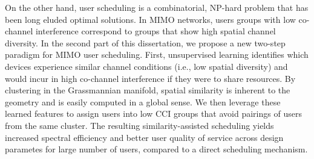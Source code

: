 On the other hand, user scheduling is a combinatorial, NP-hard problem that has been long eluded optimal solutions. 
In MIMO networks, users groups with low co-channel interference correspond to groups that show high spatial channel diversity. 
In the second part of this dissertation, we propose a new two-step paradigm for MIMO user scheduling. First, unsupervised learning identifies which devices experience similar channel conditions (i.e., low spatial diversity) and would incur in high co-channel interference if they were to share resources. By clustering in the Grassmannian manifold, spatial similarity is inherent to the geometry and is easily computed in a global sense. We then leverage these learned features to assign users into low CCI groups that avoid pairings of users from the same cluster. The resulting similarity-assisted scheduling yields increased spectral efficiency and better user quality of service across design parametes for large number of users, compared to a direct scheduling mechanism.








